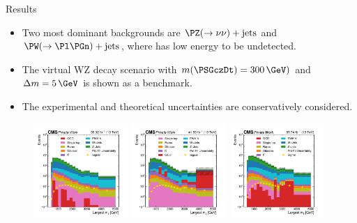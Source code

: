 \begin{frame}[fragile]{Results}
  \begin{itemize}
    \item Two most dominant backgrounds are \(\PZ(\to\nu\nu)+\text{jets}\) and \(\PW(\to\Pl\PGn)+\text{jets}\), where \Pl has low energy to be undetected.
    \item The virtual WZ decay scenario with \(m(\PSGczDt)=300\,\GeV)\) and \(\Delta m=5\,\GeV\) is shown as a benchmark.
    \item The experimental and theoretical uncertainties are conservatively considered.
  \end{itemize}

  \begin{figure}[htpb]
    \centering
    \includegraphics[width=0.32\textwidth]{fig/sr/SR-mjj-2016.pdf}
    \includegraphics[width=0.32\textwidth]{fig/sr/SR-mjj-2017.pdf}
    \includegraphics[width=0.32\textwidth]{fig/sr/SR-mjj-2018.pdf}
  \end{figure}
\end{frame}


